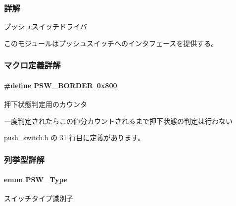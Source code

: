 \subsubsection{詳解}
プッシュスイッチドライバ 

このモジュールはプッシュスイッチへのインタフェースを提供する。

 

\subsubsection{マクロ定義詳解}
\paragraph[{P\+S\+W\+\_\+\+B\+O\+R\+D\+E\+R}]{\setlength{\rightskip}{0pt plus 5cm}\#define P\+S\+W\+\_\+\+B\+O\+R\+D\+E\+R~0x800}\label{push__switch_8h_aa47f0189e15d337406bc1bd760207db4_aa47f0189e15d337406bc1bd760207db4}


押下状態判定用のカウンタ 

一度判定されたらこの値分カウントされるまで押下状態の判定は行わない 

 push\+\_\+switch.\+h の 31 行目に定義があります。



\subsubsection{列挙型詳解}
\paragraph[{P\+S\+W\+\_\+\+Type}]{\setlength{\rightskip}{0pt plus 5cm}enum {\bf P\+S\+W\+\_\+\+Type}}\label{push__switch_8h_a66564168132ca9f7124309ee5b555b0c_a66564168132ca9f7124309ee5b555b0c}


スイッチタイプ識別子 

